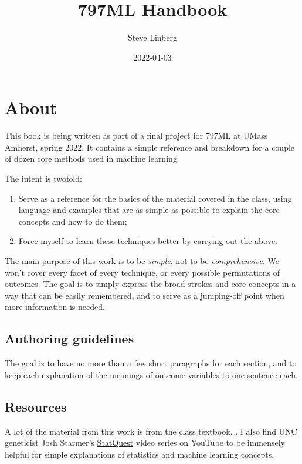 \documentclass[
]{book}
\title{797ML Handbook}
\author{Steve Linberg}
\date{2022-04-03}
\providecommand{\tightlist}{%
  \setlength{\itemsep}{0pt}\setlength{\parskip}{0pt}}
\begin{document}
\maketitle

{
\setcounter{tocdepth}{1}
\tableofcontents
}
\hypertarget{about}{%
\chapter{About}\label{about}}

This book is being written as part of a final project for 797ML at UMass
Amherst, spring 2022. It contains a simple reference and breakdown for a
couple of dozen core methods used in machine learning.

The intent is twofold:

\begin{enumerate}
\def\labelenumi{\arabic{enumi}.}
\tightlist
\item
  Serve as a reference for the basics of the material covered in the class, using language and examples that are as simple as possible to explain the core concepts and how to do them;
\item
  Force myself to learn these techniques better by carrying out the above.
\end{enumerate}

The main purpose of this work is to be \emph{simple}, not to be \emph{comprehensive}. We won't cover every facet of every technique, or every possible permutations of outcomes. The goal is to simply express the broad strokes and core concepts in a way that can be easily remembered, and to serve as a jumping-off point when more information is needed.

\hypertarget{authoring-guidelines}{%
\section{Authoring guidelines}\label{authoring-guidelines}}

The goal is to have no more than a few short paragraphs for each section, and to keep each explanation of the meanings of outcome variables to one sentence each.

\hypertarget{resources}{%
\section{Resources}\label{resources}}

A lot of the material from this work is from the class textbook, \citet{ISLR}. I also find UNC geneticist Josh Starmer's \href{https://www.youtube.com/channel/UCtYLUTtgS3k1Fg4y5tAhLbw}{StatQuest} video series on YouTube to be immensely helpful for simple explanations of statistics and machine learning concepts.
\end{document}
